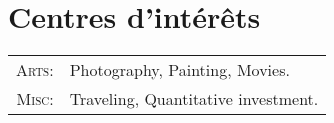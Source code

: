 %
%
%

\section{\texorpdfstring{\color{Blue}Centres d'intérêts}{Centres d'intérêts}}
\begin{tabular}{rl}
   \textsc{Arts:} & Photography, Painting, Movies.\\ 
    \textsc{Misc:} & Traveling, Quantitative investment.\\
\end{tabular}
